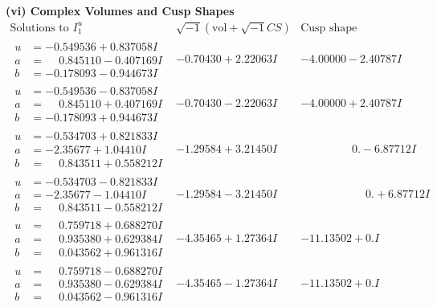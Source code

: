 \documentclass[1p]{elsarticle_modified}
\theoremstyle{definition}
\newcommand{\I}{\sqrt{-1}}
\begin{document}
\newpage\flushleft \textbf{(vi) Complex Volumes and Cusp Shapes}
$$\begin{array}{c|c|c}  
\text{Solutions to }I^u_{1}& \I (\text{vol} + \sqrt{-1}CS) & \text{Cusp shape}\\
 \hline 
\begin{aligned}
u &= -0.549536 + 0.837058 I \\
a &= \phantom{-}0.845110 - 0.407169 I \\
b &= -0.178093 - 0.944673 I\end{aligned}
 & -0.70430 + 2.22063 I & -4.00000 - 2.40787 I \\ \hline\begin{aligned}
u &= -0.549536 - 0.837058 I \\
a &= \phantom{-}0.845110 + 0.407169 I \\
b &= -0.178093 + 0.944673 I\end{aligned}
 & -0.70430 - 2.22063 I & -4.00000 + 2.40787 I \\ \hline\begin{aligned}
u &= -0.534703 + 0.821833 I \\
a &= -2.35677 + 1.04410 I \\
b &= \phantom{-}0.843511 + 0.558212 I\end{aligned}
 & -1.29584 + 3.21450 I & \phantom{-0.000000 } 0. - 6.87712 I \\ \hline\begin{aligned}
u &= -0.534703 - 0.821833 I \\
a &= -2.35677 - 1.04410 I \\
b &= \phantom{-}0.843511 - 0.558212 I\end{aligned}
 & -1.29584 - 3.21450 I & \phantom{-0.000000 -}0. + 6.87712 I \\ \hline\begin{aligned}
u &= \phantom{-}0.759718 + 0.688270 I \\
a &= \phantom{-}0.935380 + 0.629384 I \\
b &= \phantom{-}0.043562 + 0.961316 I\end{aligned}
 & -4.35465 + 1.27364 I & -11.13502 + 0. I\phantom{ +0.000000I} \\ \hline\begin{aligned}
u &= \phantom{-}0.759718 - 0.688270 I \\
a &= \phantom{-}0.935380 - 0.629384 I \\
b &= \phantom{-}0.043562 - 0.961316 I\end{aligned}
 & -4.35465 - 1.27364 I & -11.13502 + 0. I\phantom{ +0.000000I} \\ \hline\begin{aligned}

\end{aligned}
\end{array}$$
\end{document}
